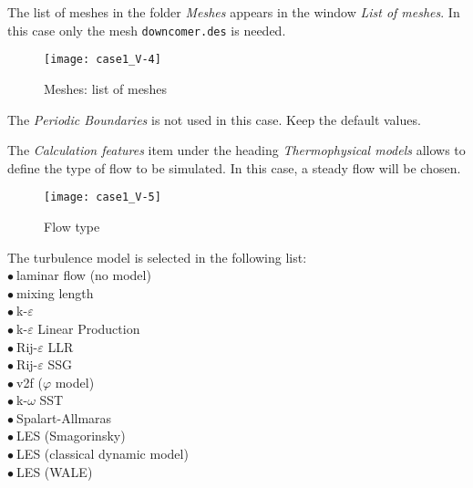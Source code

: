 The list of meshes in the folder {\itshape Meshes} appears in the window {\itshape List of meshes}.
In this case only the mesh \texttt{downcomer.des} is needed.

\begin{figure}[ht]
\begin{center}
\texttt{[image: case1\_V-4]}
\caption{Meshes: list of meshes}
\label{fig5_e1}
\end{center}
\end{figure}

The {\itshape Periodic Boundaries} is not used in this case. Keep the default values.

\clearpage
The {\itshape Calculation features} item under the heading {\itshape Thermophysical
models} allows to define the type of flow to be simulated. In this case, a
steady flow will be chosen.

\begin{figure}[ht]
\begin{center}
\texttt{[image: case1\_V-5]}
\caption{Flow type}
\label{fig7_e1}
\end{center}
\end{figure}


\clearpage
The turbulence model is selected in the following list:\\
\hspace*{1cm}$\bullet\ $laminar flow (no model)\\
\hspace*{1cm}$\bullet\ $mixing length\\
\hspace*{1cm}$\bullet\ $k-$\varepsilon$\\
\hspace*{1cm}$\bullet\ $k-$\varepsilon$ Linear Production\\
\hspace*{1cm}$\bullet\ $Rij-$\varepsilon$ LLR\\
\hspace*{1cm}$\bullet\ $Rij-$\varepsilon$ SSG\\
\hspace*{1cm}$\bullet\ $v2f ($\varphi$ model)\\
\hspace*{1cm}$\bullet\ $k-$\omega$ SST\\
\hspace*{1cm}$\bullet\ $Spalart-Allmaras\\
\hspace*{1cm}$\bullet\ $LES (Smagorinsky)\\
\hspace*{1cm}$\bullet\ $LES (classical dynamic model)\\
\hspace*{1cm}$\bullet\ $LES (WALE)

